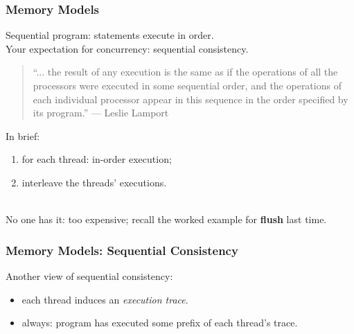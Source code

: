 \begin{frame}
  \frametitle{Memory Models}

  

  Sequential program: statements execute in order.\\

  Your expectation for concurrency: sequential consistency.

\begin{quote}
``... the result of any execution is the same as if the operations of all the processors were executed in some sequential order, and the operations of each individual processor appear in this sequence in the order specified by its program.'' --- Leslie Lamport
\end{quote}
  In brief:
  \begin{enumerate}
  \item for each thread: in-order execution;
  \item interleave the threads' executions.
  \end{enumerate}~\\

  No one has it: too expensive; recall the worked example for {\bf flush} last time.

\end{frame}



\begin{frame}
  \frametitle{Memory Models: Sequential Consistency}

  
    Another view of sequential consistency:

    \begin{itemize}
      \item each thread induces an \emph{execution trace}.
      \item always: program has executed some prefix of each thread's
        trace.
    \end{itemize}
  
\end{frame}

